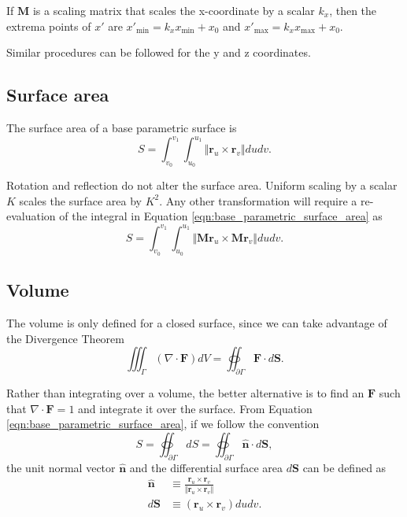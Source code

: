 If $\bm{M}$ is a scaling matrix that scales the x-coordinate by a scalar $k_x$, then the extrema points of $x'$ are $x'_{\text{min}} = k_x x_{\text{min}} + x_0$ and $x'_{\text{max}} = k_x x_{\text{max}} + x_0$.

Similar procedures can be followed for the y and z coordinates.

\subsection{Surface area}
The surface area of a base parametric surface is
\begin{equation}
    S = \int_{v_0}^{v_1} \int_{u_0}^{u_1} \Vert \bm{r}_u \times \bm{r}_v \Vert du dv.
    \label{eqn:base_parametric_surface_area}
\end{equation}

Rotation and reflection do not alter the surface area. Uniform scaling by a scalar $K$ scales the surface area by $K^2$. Any other transformation will require a re-evaluation of the integral in Equation 
\ref{eqn:base_parametric_surface_area} as
\begin{equation}
    S = \int_{v_0}^{v_1} \int_{u_0}^{u_1} \Vert \bm{M}\bm{r}_u \times \bm{M}\bm{r}_v \Vert du dv.
\end{equation}

\subsection{Volume}
The volume is only defined for a closed surface, since we can take advantage of the Divergence Theorem
\begin{equation}
    \iiint_\Gamma \left( \nabla \cdot \bm{F} \right) dV = \oiint_{\partial\Gamma} \bm{F} \cdot d\bm{S}.
\end{equation}

Rather than integrating over a volume, the better alternative is to find an $\bm{F}$ such that $\nabla \cdot \bm{F} = 1$ and integrate it over the surface. From Equation \ref{eqn:base_parametric_surface_area},
if we follow the convention
\begin{equation}
    S = \oiint_{\partial \Gamma} dS = \oiint_{\partial \Gamma} \bm{\hat{n}} \cdot d\bm{S},
\end{equation}
the unit normal vector $\bm{\hat{n}}$ and the differential surface area $d\bm{S}$ can be defined as
\begin{align}
    \bm{\hat{n}} &\equiv \frac{\bm{r}_u \times \bm{r}_v}{\Vert \bm{r}_u \times \bm{r}_v \Vert} \label{eqn:n_parametric} \\
    d\bm{S} &\equiv \left( \bm{r}_u \times \bm{r}_v \right) dudv. \label{eqn:dS_parametric}
\end{align}

